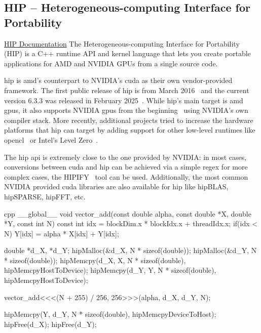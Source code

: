 \subsection{HIP -- Heterogeneous-computing Interface for Portability}
\label{sec:frameworks:hip}

\begin{quotebox}{\href{https://rocm.docs.amd.com/projects/HIP/en/latest/index.html\#hip-documentation}{HIP Documentation}}
    The Heterogeneous-computing Interface for Portability (HIP) is a C++ runtime API and kernel language that lets you create portable applications for AMD and NVIDIA GPUs from a single source code.
\end{quotebox}

\acrfull{hip} is \gls{amd}'s counterpart to NVIDIA's \gls{cuda} as their own vendor-provided framework. 
The first public release of \gls{hip} is from March 2016~\cite{advanced_micro_devices_release_2016} and the current version 6.3.3 was released in February 2025~\cite{advanced_micro_devices_release_2025}. 
While \gls{hip}'s main target is \gls{amd} \glspl{gpu}, it also supports NVIDIA \glspl{gpu} from the beginning~\cite{advanced_micro_devices_its_2016} using NVIDIA's own compiler stack.
More recently, additional projects tried to increase the hardware platforms that \gls{hip} can target by adding support for other low-level runtimes like \gls{opencl}~\cite{babej_hipcl_2020} or Intel's Level Zero~\cite{singer_hiplz_2023}.

The \gls{hip} \gls{api} is extremely close to the one provided by NVIDIA: in most cases, conversions between \gls{cuda} and \gls{hip} can be achieved via a simple regex for more complex cases, the HIPIFY~\cite{advanced_micro_devices_rocmhipify_2025} tool can be used. 
Additionally, the most common NVIDIA provided \gls{cuda} libraries are also available for \gls{hip} like hipBLAS, hipSPARSE, hipFFT, etc.

\begin{listing}
    \begin{moderncode}{cpp}
__global__ void vector_add(const double alpha, const double *X, double *Y, const int N) {
    const int idx = blockDim.x * blockIdx.x + threadIdx.x;
    if(idx < N) Y[idx] = alpha * X[idx] + Y[idx];
}
    
double *d_X, *d_Y;
hipMalloc(&d_X, N * sizeof(double));
hipMalloc(&d_Y, N * sizeof(double));
hipMemcpy(d_X, X, N * sizeof(double), hipMemcpyHostToDevice);
hipMemcpy(d_Y, Y, N * sizeof(double), hipMemcpyHostToDevice);

vector_add<<<(N + 255) / 256, 256>>>(alpha, d_X, d_Y, N);

hipMemcpy(Y, d_Y, N * sizeof(double), hipMemcpyDeviceToHost);
hipFree(d_X);
hipFree(d_Y);
    \end{moderncode}
    \caption{%
    A simple DAXPY example using \gls{hip} including all necessary memory and kernel launch operations.
    }
    \label{code:hip_example}
\end{listing}

